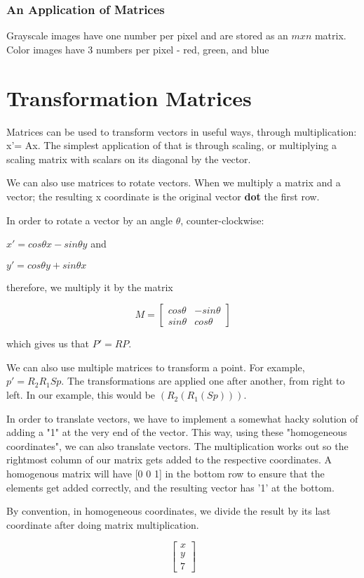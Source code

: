 \documentclass{article}
\begin{document}
\subsubsection{An Application of Matrices}
Grayscale images have one number per pixel and are stored as an $mxn$ matrix. Color images have 3 numbers per pixel - red, green, and blue \section{Transformation Matrices}
Matrices can be	used to transform vectors in useful ways, through multiplication:
x’= Ax. The simplest application of that is through scaling, or multiplying a scaling matrix with scalars on its diagonal by the vector.

We can also use matrices to rotate vectors. When we multiply a matrix and a vector; the resulting x coordinate is the original vector \textbf{dot} the first row.


In order to rotate a vector by an angle $\theta$, counter-clockwise:

$x'= cos\theta x -sin \theta y$ and

$y'= cos\theta y +sin \theta x$

therefore, we multiply it by the matrix

\[
M=
  \begin{bmatrix}
    cos\theta & -sin\theta \\
    sin\theta & cos\theta
  \end{bmatrix}
\]

which gives us that $P'= R P$.

We can also use multiple matrices to transform a point. For example, $p' = R_2 R_1 S p$. The transformations are applied one after another, from right to left. In our example, this would be $(R_2(R_1(S p)))$.

In order to translate vectors, we have to implement a somewhat hacky solution of adding a "1" at the very end of the vector. This way, using these "homogeneous coordinates", we can also translate vectors. The multiplication works out so the rightmost column of our matrix gets added to the respective coordinates. A homogenous matrix will have [0 0 1] in the bottom row to ensure that the elements get added correctly, and the resulting vector has '1' at the bottom.

By convention, in homogeneous coordinates, we divide the result by its last coordinate after doing matrix multiplication.

\[
  \begin{bmatrix}
    x \\
    y \\
    7
  \end{bmatrix}
\]
\end{document}
